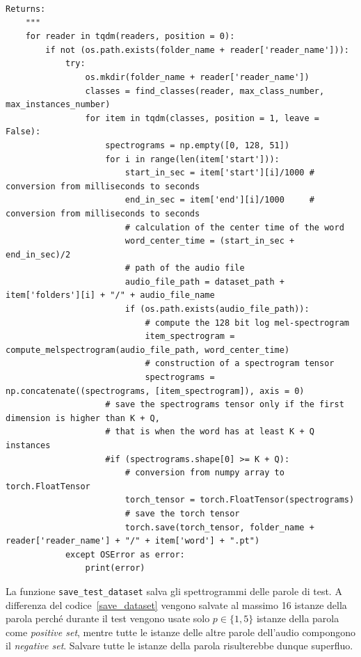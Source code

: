 \documentclass[12pt,a4paper,titlepage]{article}
\begin{document}
\begin{lstlisting}[language=iPython,firstnumber=164, caption=Funzione \texttt{save\_dataset}, label=save_dataset,captionpos=b]
    Returns:
    """
    for reader in tqdm(readers, position = 0):
        if not (os.path.exists(folder_name + reader['reader_name'])):
            try:
                os.mkdir(folder_name + reader['reader_name'])
                classes = find_classes(reader, max_class_number, max_instances_number)
                for item in tqdm(classes, position = 1, leave = False):
                    spectrograms = np.empty([0, 128, 51])
                    for i in range(len(item['start'])):
                        start_in_sec = item['start'][i]/1000 # conversion from milliseconds to seconds
                        end_in_sec = item['end'][i]/1000     # conversion from milliseconds to seconds
                        # calculation of the center time of the word
                        word_center_time = (start_in_sec + end_in_sec)/2
                        # path of the audio file
                        audio_file_path = dataset_path + item['folders'][i] + "/" + audio_file_name
                        if (os.path.exists(audio_file_path)):
                            # compute the 128 bit log mel-spectrogram
                            item_spectrogram = compute_melspectrogram(audio_file_path, word_center_time)
                            # construction of a spectrogram tensor
                            spectrograms = np.concatenate((spectrograms, [item_spectrogram]), axis = 0)
                    # save the spectrograms tensor only if the first dimension is higher than K + Q, 
                    # that is when the word has at least K + Q instances
                    #if (spectrograms.shape[0] >= K + Q):
                        # conversion from numpy array to torch.FloatTensor
                        torch_tensor = torch.FloatTensor(spectrograms)
                        # save the torch tensor
                        torch.save(torch_tensor, folder_name + reader['reader_name'] + "/" + item['word'] + ".pt")
            except OSError as error:
                print(error)   
\end{lstlisting}

La funzione \texttt{save\_test\_dataset} salva gli spettrogrammi delle parole di test. A differenza del codice~\ref{save_dataset} vengono salvate al massimo 16 istanze della parola perché durante il test vengono usate solo $p \in \{1, 5\}$ istanze della parola come \emph{positive set}, mentre tutte le istanze delle altre parole dell'audio compongono il \emph{negative set}. Salvare tutte le istanze della parola risulterebbe dunque superfluo.
\end{document}
